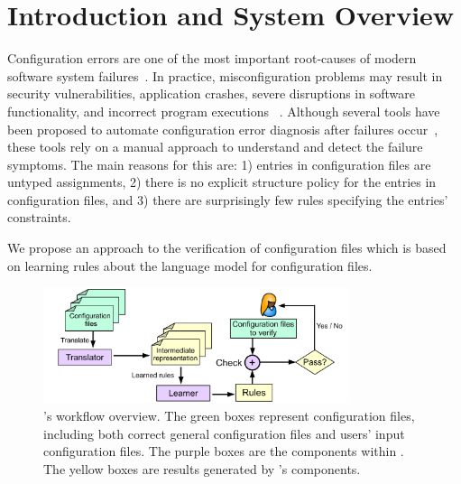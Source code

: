 \section{Introduction and System Overview}
\label{sec:Intro}

Configuration errors are one of the most important root-causes of
modern software system failures~\cite{xu15systems,yin11anempirical}.
In practice, misconfiguration problems may result in security
vulnerabilities, application crashes, severe disruptions in software
functionality, and incorrect program executions%
~\cite{xu15systems,zhang14encore,yuan11context}.  Although several
tools have been proposed to automate configuration error diagnosis
after failures occur~\cite{wang04automatic,attariyan10automating,
su07autobash,whitaker04configuration}, these tools rely on a manual approach
  to understand and detect the failure symptoms. The main reasons for this are:
  1) entries in configuration files are untyped assignments, 2) there
  is no explicit structure policy for the entries in configuration
  files, and 3) there are surprisingly few rules specifying the
  entries' constraints.

We propose an approach to the verification of  
configuration files which is based on learning rules about the language 
model for configuration files. 

\begin{figure}[t] \centering
\includegraphics[width=0.8\textwidth]{figs/overview}
\caption{\app's workflow overview. The green boxes represent configuration files,
  including both correct general configuration files and users' input
  configuration files. The purple boxes are the components within \app.
  The yellow boxes are results generated by \app's components.}
\label{fig-overview}
\end{figure}

